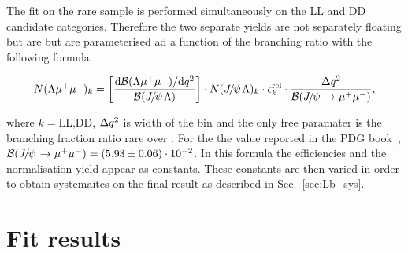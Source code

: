 The fit on the rare sample is performed simultaneously on the LL and DD candidate categories.
Therefore the two separate yields are not separately floating but are but are parameterised
ad a function of the branching ratio with the following formula:

\begin{equation}
N(\Lz\mumu)_{k}  = \left[ \frac{\mathrm{d}\mathcal{B}(\Lz\mumu)/\mathrm{d}\qsq}{\mathcal{B}(\jpsi\Lz)} \right]  \cdot
N(\jpsi\Lz)_{k} \cdot \epsilon^{\mathrm{rel}}_{k} \cdot \frac {\Delta\qsq} { \mathcal{B}(\jpsi\to\mumu) },
\label{eq:relYield}
\end{equation}

where $k = $LL,DD, $\Delta q^2$ is width of the \qsq bin and the only free paramater is the branching 
fraction ratio rare over \jpsi. For the \jpsi\to\mumu the value reported in the PDG book~\cite{PDG2014}, 
$\mathcal{B}(\jpsi\to\mumu) = (5.93 \pm 0.06)\cdot 10^{-2}$. In this formula the efficiencies and the normalisation 
yield appear as constants. These constants are then varied in order to obtain systemaitcs on the final result 
as described in Sec.~\ref{sec:Lb_sys}.


\section{Fit results}



